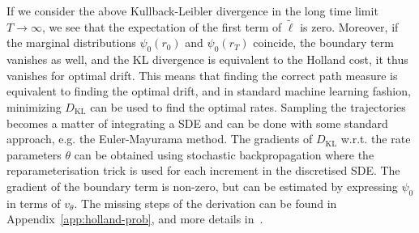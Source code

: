If we consider the above Kullback-Leibler divergence in the long time limit $T \rightarrow \infty$, we see that the expectation of the first term of $\tilde{\ell}$ is zero. Moreover, if the marginal distributions $\psi_{0}(r_0)$ and $\psi_{0}(r_T)$ coincide, the boundary term vanishes as well, and the KL divergence is equivalent to the Holland cost, it thus vanishes for optimal drift. This means that finding the correct path measure is equivalent to finding the optimal drift, and in standard machine learning fashion, minimizing $D_{\mathrm{KL}}$ can be used to find the optimal rates. Sampling the trajectories becomes a matter of integrating a SDE and can be done with some standard approach, e.g. the Euler-Mayurama method. The gradients of $D_{\mathrm{KL}}$ w.r.t. the rate parameters $\theta$ can be obtained using stochastic backpropagation where the reparameterisation trick is used for each increment in the discretised SDE. The gradient of the boundary term is non-zero, but can be estimated by expressing $\psi_0$ in terms of $v_{\theta}$. The missing steps of the derivation can be found in Appendix~\ref{app:holland-prob}, and more details in~\cite{barr2020quantum}. 

